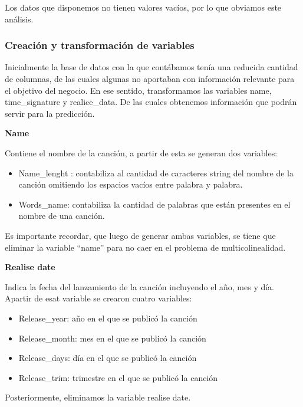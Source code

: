 \documentclass[
  letterpaper,
  DIV=11,
  numbers=noendperiod]{scrartcl}
\providecommand{\tightlist}{%
  \setlength{\itemsep}{0pt}\setlength{\parskip}{0pt}}
\begin{document}
Los datos que disponemos no tienen valores vacíos, por lo que obviamos
este análisis.

\hypertarget{creaciuxf3n-y-transformaciuxf3n-de-variables}{%
\subsubsection{Creación y transformación de
variables}\label{creaciuxf3n-y-transformaciuxf3n-de-variables}}

Inicialmente la base de datos con la que contábamos tenía una reducida
cantidad de columnas, de las cuales algunas no aportaban con información
relevante para el objetivo del negocio. En ese sentido, transformamos
las variables name, time\_signature y realice\_data. De las cuales
obtenemos información que podrán servir para la predicción.

\textbf{Name}

Contiene el nombre de la canción, a partir de esta se generan dos
variables:

\begin{itemize}
\tightlist
\item
  Name\_lenght : contabiliza al cantidad de caracteres string del nombre
  de la canción omitiendo los espacios vacíos entre palabra y palabra.
\item
  Words\_name: contabiliza la cantidad de palabras que están presentes
  en el nombre de una canción.
\end{itemize}

Es importante recordar, que luego de generar ambas variables, se tiene
que eliminar la variable ``name'' para no caer en el problema de
multicolinealidad.

\textbf{Realise date}

Indica la fecha del lanzamiento de la canción incluyendo el año, mes y
día. Apartir de esat variable se crearon cuatro variables:

\begin{itemize}
\tightlist
\item
  Release\_year: año en el que se publicó la canción
\item
  Release\_month: mes en el que se publicó la canción
\item
  Release\_days: día en el que se publicó la canción
\item
  Release\_trim: trimestre en el que se publicó la canción
\end{itemize}

Posteriormente, eliminamos la variable realise date.
\end{document}
